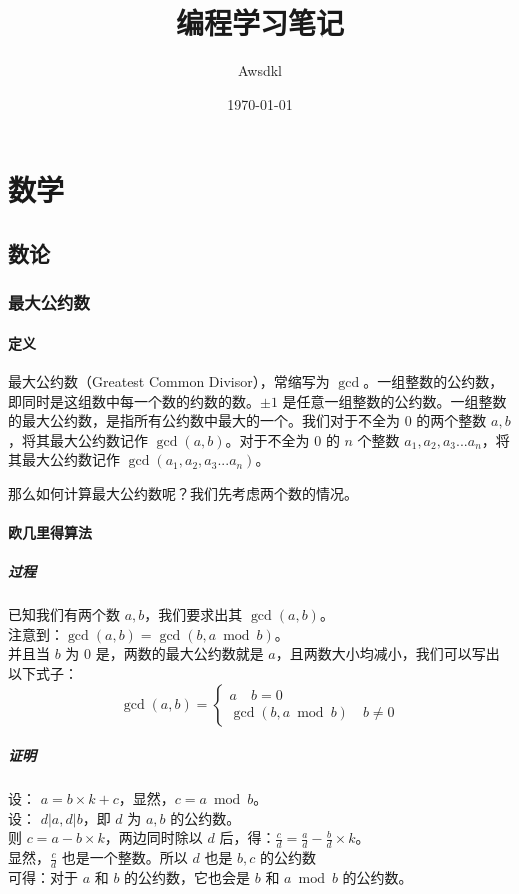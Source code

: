 \documentclass[11pt,oneside,a4paper,UTF8]{book}
\title{编程学习笔记}
\author{Awsdkl}
\date{\today}
\begin{document}
	\maketitle
	\tableofcontents
	\part{数学}
	\chapter{数论}
	\section{最大公约数}
	\subsection{定义}
	最大公约数（Greatest Common Divisor），常缩写为 $\gcd$。一组整数的公约数，即同时是这组数中每一个数的约数的数。$\pm 1$ 是任意一组整数的公约数。一组整数的最大公约数，是指所有公约数中最大的一个。我们对于不全为 $0$ 的两个整数 $a,b$，将其最大公约数记作 $\gcd(a,b)$。对于不全为 $0$ 的 $n$ 个整数 $a_1,a_2,a_3 ... a_n$，将其最大公约数记作 $\gcd(a_1,a_2,a_3...a_n)$。\par
	那么如何计算最大公约数呢？我们先考虑两个数的情况。
	\subsection{欧几里得算法}
	\subsubsection{过程}
	\noindent
	已知我们有两个数 $a,b$，我们要求出其 $\gcd(a,b)$。\\
	注意到：$\gcd(a,b) = \gcd(b,a \bmod b)$。\\
	并且当 $b$ 为 $0$ 是，两数的最大公约数就是 $a$，且两数大小均减小，我们可以写出以下式子：\\
	\begin{equation}
	\gcd(a,b) =\left\{
		\begin{aligned}
			a \quad b = 0\\
			\gcd(b,a \bmod b) \quad b\not= 0
		\end{aligned}
		\right
		.
	\end{equation}
	\subsubsection{证明}
	\noindent
	设： $a = b \times k + c$，显然，$c = a \bmod b$。\\
	设： $d | a,d | b$，即 $d$ 为 $a,b$ 的公约数。\\
	则 $c = a - b \times k$，两边同时除以 $d$ 后，得：$\frac{c}{d} = \frac{a}{d} - \frac{b}{d} \times k$。\\
	显然，$\frac{c}{d}$ 也是一个整数。所以 $d$ 也是 $b,c$ 的公约数\\
	可得：对于 $a$ 和 $b$ 的公约数，它也会是 $b$ 和 $a \bmod b$ 的公约数。\\
	
\end{document}
